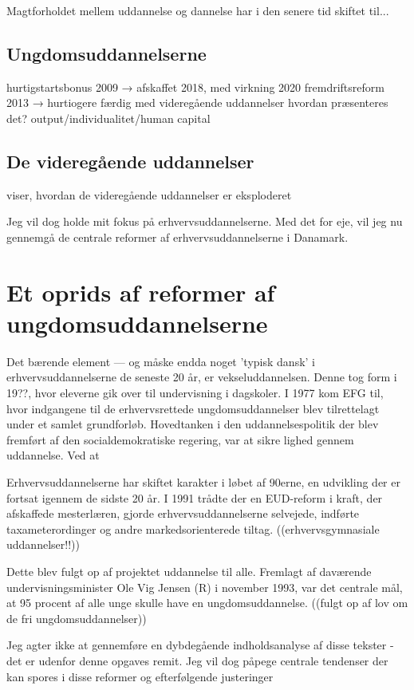 Magtforholdet mellem uddannelse og dannelse har i den senere tid skiftet til...

\subsection{Ungdomsuddannelserne}

hurtigstartsbonus 2009 → afskaffet 2018, med virkning 2020
fremdriftsreform 2013 → hurtiogere færdig med videregående uddannelser
hvordan præsenteres det? output/individualitet/human capital
\subsection{De videregående uddannelser}
\autocite{schoferWorldwideExpansionHigher2005} viser, hvordan de videregående uddannelser er eksploderet 

Jeg vil dog holde mit fokus på erhvervsuddannelserne.
Med det for eje, vil jeg nu gennemgå de centrale reformer af erhvervsuddannelserne i Danamark.
\section{Et oprids af reformer af ungdomsuddannelserne}
Det bærende element --- og måske endda noget 'typisk dansk' i erhvervsuddannelserne de seneste 20 år, er vekseluddannelsen.
Denne tog form i 19??, hvor eleverne gik over til undervisning i dagskoler.
I 1977 kom EFG til, hvor indgangene til de erhvervsrettede ungdomsuddannelser blev tilrettelagt under et samlet grundforløb.
Hovedtanken i den uddannelsespolitik der blev fremført af den socialdemokratiske regering, var at sikre lighed gennem uddannelse.
Ved at 

Erhvervsuddannelserne har skiftet karakter i løbet af 90erne, en udvikling der er fortsat igennem de sidste 20 år.
I 1991 trådte der en EUD-reform i kraft, der afskaffede mesterlæren, gjorde erhvervsuddannelserne selvejede, indførte taxameterordinger og andre markedsorienterede tiltag.
((erhvervsgymnasiale uddannelser!!))


Dette blev fulgt op af projektet uddannelse til alle.
Fremlagt af daværende undervisningsminister Ole Vig Jensen (R) i november 1993, var det centrale mål, at 95 procent af alle unge skulle have en ungdomsuddannelse.
((fulgt op af lov om de fri ungdomsuddannelser))

Jeg agter ikke at gennemføre en dybdegående indholdsanalyse af disse tekster - det er udenfor denne opgaves remit.
Jeg vil dog påpege centrale tendenser der kan spores i disse reformer og efterfølgende justeringer
